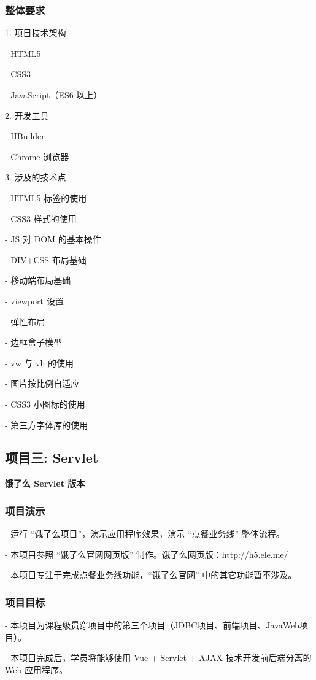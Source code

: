 \subsubsection{整体要求}
1. 项目技术架构

   - HTML5

   - CSS3

   - JavaScript（ES6 以上）

   
2. 开发工具

   - HBuilder

   - Chrome 浏览器

   
3. 涉及的技术点

   - HTML5 标签的使用

   - CSS3 样式的使用

   - JS 对 DOM 的基本操作

   - DIV+CSS 布局基础

   - 移动端布局基础

   - viewport 设置

   - 弹性布局

   - 边框盒子模型

   - vw 与 vh 的使用

   - 图片按比例自适应

   - CSS3 小图标的使用

   - 第三方字体库的使用



\subsection{项目三: Servlet}

\textbf{饿了么 Servlet 版本}

\subsubsection{项目演示}
- 运行 “饿了么项目”，演示应用程序效果，演示 “点餐业务线” 整体流程。

- 本项目参照 “饿了么官网网页版” 制作。饿了么网页版：http://h5.ele.me/

- 本项目专注于完成点餐业务线功能，“饿了么官网” 中的其它功能暂不涉及。


\subsubsection{项目目标}
- 本项目为课程级贯穿项目中的第三个项目（JDBC项目、前端项目、JavaWeb项目）。

- 本项目完成后，学员将能够使用 Vue + Servlet + AJAX 技术开发前后端分离的 Web 应用程序。


